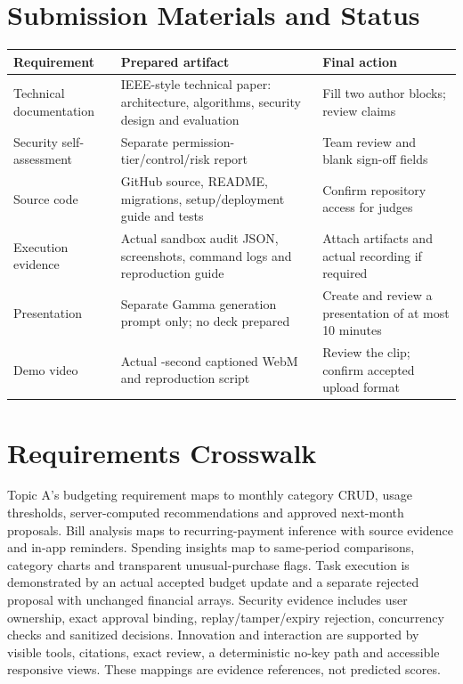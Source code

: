 \documentclass[conference,onecolumn,a4paper]{IEEEtran}
\begin{document}
\section{Submission Materials and Status}
\noindent\begin{tabularx}{\textwidth}{L{35mm}L{73mm}X}
\toprule Requirement & Prepared artifact & Final action\\\midrule
Technical documentation & IEEE-style technical paper: architecture, algorithms, security design and evaluation & Fill two author blocks; review claims\\[2mm]
Security self-assessment & Separate permission-tier/control/risk report & Team review and blank sign-off fields\\[2mm]
Source code & GitHub source, README, migrations, setup/deployment guide and tests & Confirm repository access for judges\\[2mm]
Execution evidence & Actual sandbox audit JSON, screenshots, command logs and reproduction guide & Attach artifacts and actual recording if required\\[2mm]
Presentation & Separate Gamma generation prompt only; no deck prepared & Create and review a presentation of at most 10 minutes\\[2mm]
Demo video & Actual \DemoSeconds{}-second captioned WebM and reproduction script & Review the clip; confirm accepted upload format\\
\bottomrule
\end{tabularx}

\section{Requirements Crosswalk}
Topic A's budgeting requirement maps to monthly category CRUD, usage thresholds, server-computed recommendations and approved next-month proposals. Bill analysis maps to recurring-payment inference with source evidence and in-app reminders. Spending insights map to same-period comparisons, category charts and transparent unusual-purchase flags. Task execution is demonstrated by an actual accepted budget update and a separate rejected proposal with unchanged financial arrays. Security evidence includes user ownership, exact approval binding, replay/tamper/expiry rejection, concurrency checks and sanitized decisions. Innovation and interaction are supported by visible tools, citations, exact review, a deterministic no-key path and accessible responsive views. These mappings are evidence references, not predicted scores.
\end{document}

